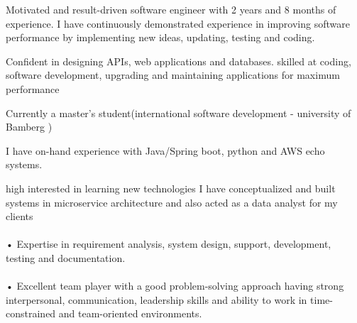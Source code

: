 %
%
%
\par{


    Motivated and result-driven software engineer with 2 years and 8 months of experience. I have continuously demonstrated experience in improving software performance by implementing new ideas, updating, testing and coding.

    Confident in designing APIs, web applications and databases. skilled at coding, software development, upgrading and maintaining applications for maximum performance  


    Currently  a master's student(international software development - university of Bamberg )

    I have on-hand experience with Java/Spring boot, python and AWS echo systems.
    
    high interested in learning new technologies I have conceptualized and built systems in microservice architecture and also acted as a data analyst for my clients 
    \\
    \\
    • Expertise in requirement analysis, system design, support, development, testing and documentation.
    \\
    \\
    • Excellent team player with a good problem-solving approach having strong interpersonal, communication, leadership skills and ability to work in time-constrained and team-oriented environments.



}